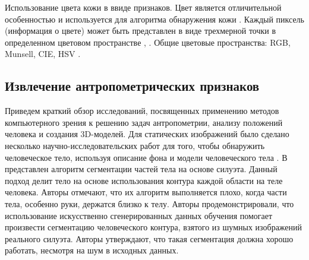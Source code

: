 Использование цвета кожи в ввиде признаков. Цвет является отличительной особенностью и используется для алгоритма обнаружения кожи \cite{Fink2006}. Каждый пиксель (информация о цвете) может быть представлен в виде трехмерной точки в определенном цветовом пространстве \cite{Albio2001}, \cite{Shin2002}. Общие цветовые пространства: RGB, Munsell, CIE, HSV \cite{Jones2002}.

\subsection{Извлечение антропометрических признаков}

Приведем краткий обзор исследований, посвященных применению методов компьютерного зрения к решению задач антропометрии, анализу положений человека и создания 3D-моделей. Для статических изображений было сделано несколько научно-исследовательских работ для того, чтобы обнаружить человеческое тело, используя описание фона и модели человеческого тела \cite{Mori2002}. В \cite{Belongie2002} представлен алгоритм сегментации частей тела на основе силуэта. Данный подход делит тело на основе использования контура каждой области на теле человека. Авторы отмечают, что их алгоритм выполняется плохо, когда части тела, особенно руки, держатся близко к телу. Авторы \cite{Mittal2003} продемонстрировали, что использование искусственно сгенерированных данных обучения помогает произвести сегментацию человеческого контура, взятого из шумных изображений реального силуэта. Авторы утверждают, что такая сегментация должна хорошо работать, несмотря на шум в исходных данных.


